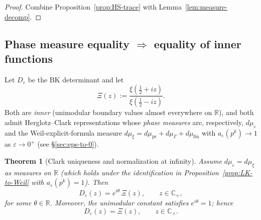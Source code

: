 ﻿\documentclass[12pt,a4paper]{article}
\newtheorem{theorem}{Theorem}[section]
\theoremstyle{definition}
\theoremstyle{remark}
\begin{document}
\begin{proof}
Combine Proposition~\ref{prop:HS-trace} with Lemma~\ref{lem:measure-decomp}.
\end{proof}

\subsection{Phase measure equality $\Rightarrow$ equality of inner functions}

Let $D_\varepsilon$ be the BK determinant and let
\begin{equation}\label{eq:D-xi}
\Xi(z):=\frac{\xi(\tfrac{1}{2}+iz)}{\xi(\tfrac{1}{2}-iz)}.
\end{equation}
Both are \emph{inner} (unimodular boundary values almost everywhere on $\mathbb{R}$), and both admit Herglotz--Clark representations whose \emph{phase measures} are, respectively, $d\mu_\varepsilon$ and the Weil-explicit-formula measure $d\mu_\xi=d\mu_{\mathrm{pr}}+d\mu_{\Gamma}+d\mu_{\mathrm{fin}}$ with $a_\varepsilon(p^k)\to 1$ as $\varepsilon\to 0^+$ (see \S\ref{sec:eps-to-0}).

\begin{theorem}[Clark uniqueness and normalization at infinity]\label{thm:Clark}
Assume $d\mu_\varepsilon=d\mu_\xi$ as measures on $\mathbb{R}$ (which holds under the identification in Proposition~\ref{prop:LK-to-Weil} with $a_\varepsilon(p^k)=1$). Then
\begin{equation}\label{eq:inner-equality-up-to-const}
D_\varepsilon(z)=e^{i\theta}\,\Xi(z),\qquad z\in\mathbb{C}_+,
\end{equation}
for some $\theta\in\mathbb{R}$. Moreover, the unimodular constant satisfies $e^{i\theta}=1$; hence
\begin{equation}\label{eq:inner-equality}
D_\varepsilon(z)=\Xi(z),\qquad z\in\mathbb{C}_+.
\end{equation}
\end{theorem}
\end{document}
